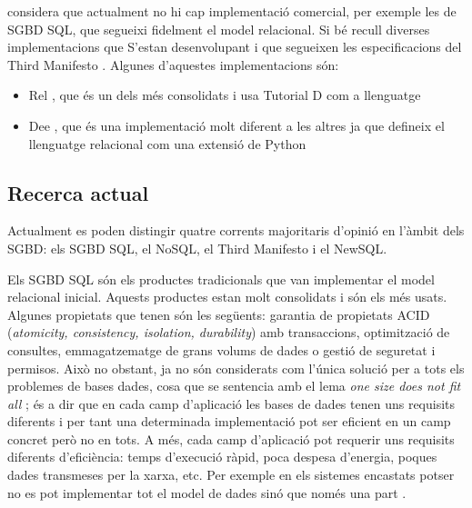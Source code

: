 \textcite[cap.~2]{date06} %
considera que actualment no hi cap implementació comercial, per
exemple les de SGBD SQL, que segueixi fidelment el model relacional.
Si bé recull diverses implementacions que
S'estan desenvolupant i que segueixen les
especificacions del Third
Manifesto \parencite[Projects]{date:thethirdmanifesto.com}.  Algunes
d'aquestes implementacions són:
\begin{itemize}
\item Rel \parencite{rel}, que és un dels més consolidats i usa
  Tutorial D com a llenguatge
\item Dee \parencite{dee}, que és una implementació molt diferent a
  les altres ja que defineix el llenguatge relacional com una extensió
  de Python
\end{itemize}










\subsection{Recerca actual}

Actualment es poden distingir quatre corrents majoritaris d'opinió en
l'àmbit dels SGBD: els SGBD SQL, el NoSQL, el Third Manifesto i el
NewSQL.

Els SGBD SQL són els productes tradicionals que van implementar el
model relacional inicial. Aquests productes estan molt consolidats i
són els més usats. Algunes propietats que tenen són les següents:
garantia de propietats ACID (\emph{atomicity, consistency, isolation,
  durability}) amb transaccions, optimització de consultes,
emmagatzematge de grans volums de dades o gestió de seguretat i
permisos.  Això no obstant, ja no són considerats com l'única solució
per a tots els problemes de bases dades, cosa que se sentencia amb el
lema \emph{one size does not fit
  all} \parencite{stonebraker07,stonebraker09}; és a dir que en cada
camp d'aplicació les bases de dades tenen uns requisits diferents i
per tant una determinada implementació pot ser eficient en un camp
concret però no en tots. A més, cada camp d'aplicació pot requerir uns
requisits diferents d'eficiència: temps d'execució ràpid, poca despesa
d'energia, poques dades transmeses per la xarxa, etc. Per exemple en
els sistemes encastats potser no es pot implementar tot el model de
dades sinó que només una
part \parencite{saake09:_downs_data_manag_embed_system}.



